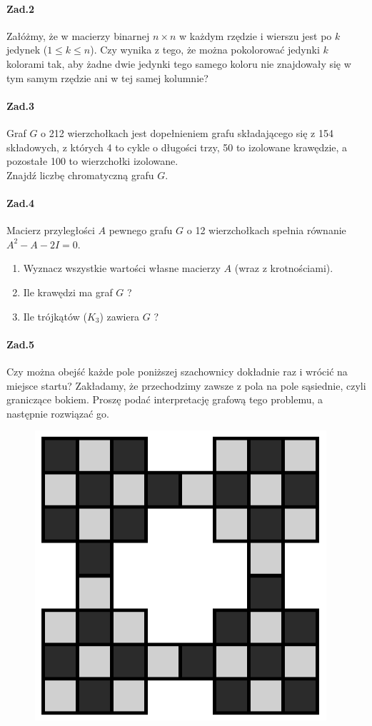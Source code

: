 \paragraph{Zad.2} Załóżmy, że w macierzy binarnej $n\times n$ w każdym rzędzie i wierszu jest po $k$ jedynek ($1 \leq k \leq n$). Czy wynika z tego, że można pokolorować jedynki $k$ kolorami tak, aby żadne dwie jedynki tego samego koloru nie znajdowały się w tym samym rzędzie ani w tej samej kolumnie?

\paragraph{Zad.3} Graf $G$ o 212 wierzchołkach jest dopełnieniem grafu składającego się z 154 składowych, z których 4 to cykle o długości trzy, 50 to izolowane krawędzie, a pozostałe 100 to wierzchołki izolowane.\\
Znajdź liczbę chromatyczną grafu $G$.

\paragraph{Zad.4} Macierz przyległości $A$ pewnego grafu $G$ o 12 wierzchołkach spełnia równanie $A^2-A-2I = 0$.
\begin{enumerate}[label=\alph*)]
\item Wyznacz wszystkie wartości własne macierzy $A$ (wraz z krotnościami).
\item Ile krawędzi ma graf $G$ ?
\item Ile trójkątów ($K_3$) zawiera $G$ ?
\end{enumerate}


\paragraph{Zad.5} Czy można obejść każde pole poniższej szachownicy dokładnie raz i wrócić na miejsce startu? Zakładamy, że przechodzimy zawsze z pola na pole sąsiednie, czyli graniczące bokiem. Proszę podać interpretację grafową tego problemu, a następnie rozwiązać go.

\begin{figure}[H]
\centering
\includegraphics[width=.6\textwidth]{img/ROZ_1_5}
\end{figure}

